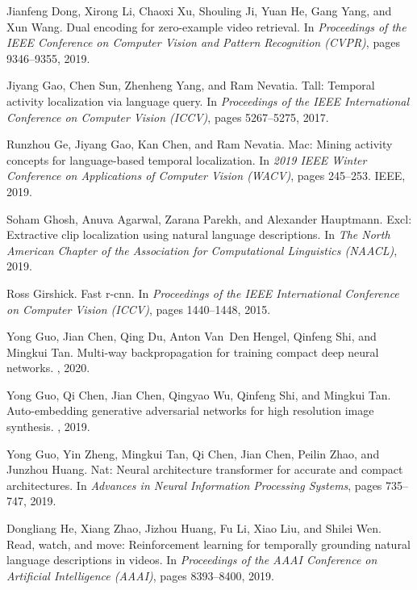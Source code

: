 \documentclass[10pt,twocolumn,letterpaper]{article}
\begin{document}
\begin{thebibliography}{10}
	Jianfeng Dong, Xirong Li, Chaoxi Xu, Shouling Ji, Yuan He, Gang Yang, and Xun
	Wang.
	\newblock Dual encoding for zero-example video retrieval.
	\newblock In {\em Proceedings of the IEEE Conference on Computer Vision and
		Pattern Recognition (CVPR)}, pages 9346--9355, 2019.
	
	Jiyang Gao, Chen Sun, Zhenheng Yang, and Ram Nevatia.
	\newblock Tall: Temporal activity localization via language query.
	\newblock In {\em Proceedings of the IEEE International Conference on Computer
		Vision (ICCV)}, pages 5267--5275, 2017.
	
	Runzhou Ge, Jiyang Gao, Kan Chen, and Ram Nevatia.
	\newblock Mac: Mining activity concepts for language-based temporal
	localization.
	\newblock In {\em 2019 IEEE Winter Conference on Applications of Computer
		Vision (WACV)}, pages 245--253. IEEE, 2019.
	
	Soham Ghosh, Anuva Agarwal, Zarana Parekh, and Alexander Hauptmann.
	\newblock Excl: Extractive clip localization using natural language
	descriptions.
	\newblock In {\em The North American Chapter of the Association for
		Computational Linguistics (NAACL)}, 2019.
	
	Ross Girshick.
	\newblock Fast r-cnn.
	\newblock In {\em Proceedings of the IEEE International Conference on Computer
		Vision (ICCV)}, pages 1440--1448, 2015.
	
	Yong Guo, Jian Chen, Qing Du, Anton Van~Den Hengel, Qinfeng Shi, and Mingkui
	Tan.
	\newblock Multi-way backpropagation for training compact deep neural networks.
	, 2020.
	
	Yong Guo, Qi Chen, Jian Chen, Qingyao Wu, Qinfeng Shi, and Mingkui Tan.
	\newblock Auto-embedding generative adversarial networks for high resolution
	image synthesis.
	, 2019.
	
	Yong Guo, Yin Zheng, Mingkui Tan, Qi Chen, Jian Chen, Peilin Zhao, and Junzhou
	Huang.
	\newblock Nat: Neural architecture transformer for accurate and compact
	architectures.
	\newblock In {\em Advances in Neural Information Processing Systems}, pages
	735--747, 2019.
	
	Dongliang He, Xiang Zhao, Jizhou Huang, Fu Li, Xiao Liu, and Shilei Wen.
	\newblock Read, watch, and move: Reinforcement learning for temporally
	grounding natural language descriptions in videos.
	\newblock In {\em Proceedings of the AAAI Conference on Artificial Intelligence
		(AAAI)}, pages 8393--8400, 2019.
	

\end{thebibliography}
\end{document}
